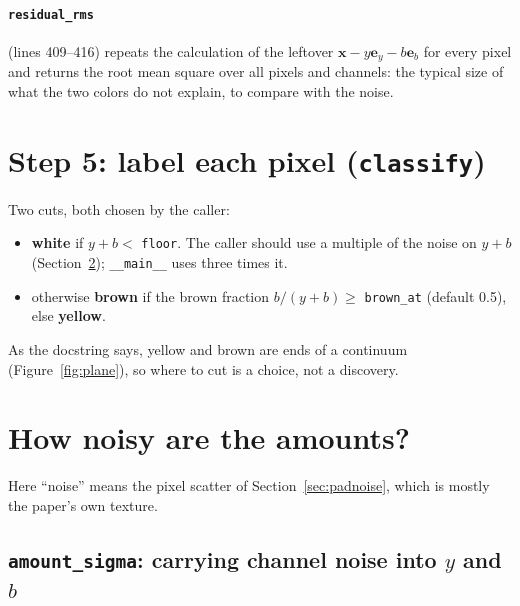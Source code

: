 \documentclass[11pt,letterpaper]{article}
\newcommand{\code}[1]{\texttt{#1}}
\newcommand{\vx}{\mathbf{x}}
\newcommand{\ey}{\mathbf{e}_y}
\newcommand{\eb}{\mathbf{e}_b}
\newcommand{\src}[3]{%
  }
\begin{document}
\paragraph{\code{residual\_rms}} (lines 409--416) repeats the calculation of
the leftover $\vx - y\ey - b\eb$ for every pixel and returns the root mean
square over all pixels and channels: the typical size of what the two colors
do not explain, to compare with the noise.

\section{Step 5: label each pixel (\code{classify})}
\label{sec:classify}

\src{444}{450}{The body of \code{classify}.}

Two cuts, both chosen by the caller:
\begin{itemize}[nosep]
\item \textbf{white} if $y + b <$ \code{floor}.  The caller should use a
  multiple of the noise on $y+b$ (Section~\ref{sec:noise});
  \code{\_\_main\_\_} uses three times it.
\item otherwise \textbf{brown} if the brown fraction $b/(y+b) \ge$
  \code{brown\_at} (default 0.5), else \textbf{yellow}.
\end{itemize}
As the docstring says, yellow and brown are ends of a continuum
(Figure~\ref{fig:plane}), so where to cut is a choice, not a discovery.

\section{How noisy are the amounts?}
\label{sec:noise}

Here ``noise'' means the pixel scatter of Section~\ref{sec:padnoise}, which
is mostly the paper's own texture.

\subsection{\code{amount\_sigma}: carrying channel noise into $y$ and $b$}

\src{469}{479}{The body of \code{amount\_sigma}.}
\end{document}
